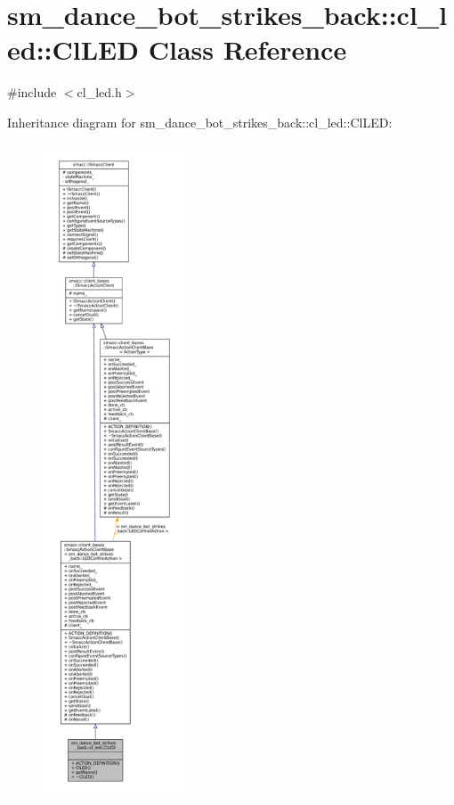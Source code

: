 \hypertarget{classsm__dance__bot__strikes__back_1_1cl__led_1_1ClLED}{}\section{sm\+\_\+dance\+\_\+bot\+\_\+strikes\+\_\+back\+:\+:cl\+\_\+led\+:\+:Cl\+L\+ED Class Reference}
\label{classsm__dance__bot__strikes__back_1_1cl__led_1_1ClLED}


{\ttfamily \#include $<$cl\+\_\+led.\+h$>$}



Inheritance diagram for sm\+\_\+dance\+\_\+bot\+\_\+strikes\+\_\+back\+:\+:cl\+\_\+led\+:\+:Cl\+L\+ED\+:
\nopagebreak
\begin{figure}[H]
\begin{center}
\leavevmode
\includegraphics[height=550pt]{classsm__dance__bot__strikes__back_1_1cl__led_1_1ClLED__inherit__graph}
\end{center}
\end{figure}


